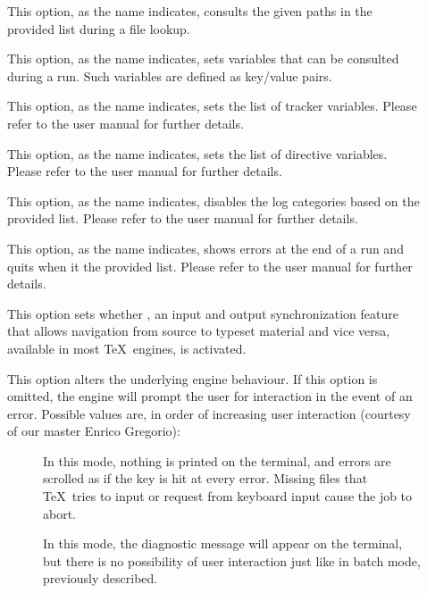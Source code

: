 \begin{description}
\begin{description}
\item[] This option, as the name indicates, consults the given paths in the provided list during a file lookup.

\item[] This option, as the name indicates, sets variables that can be consulted during a run. Such variables are defined as key/value pairs.

\item[]  This option, as the name indicates, sets the list of tracker variables. Please refer to the user manual for further details.

\item[]  This option, as the name indicates, sets the list of directive variables. Please refer to the user manual for further details.

\item[] This option, as the name indicates, disables the log categories based on the provided list. Please refer to the user manual for further details.

\item[]  This option, as the name indicates, shows errors at the end of a run and quits when it the provided list. Please refer to the user manual for further details.

\item[] This option sets whether , an input and output synchronization feature that allows navigation from source to typeset material and vice versa, available in most \TeX\ engines, is activated.

\item[] This option alters the underlying engine behaviour. If this option is omitted, the engine will prompt the user for interaction in the event of an error. Possible values are, in order of increasing user interaction (courtesy of our master Enrico Gregorio):

\begin{description}
\item[] In this mode, nothing is printed on the terminal, and errors are scrolled as if the  key is hit at every error. Missing files that \TeX\ tries to input or request from keyboard input cause the job to abort.

\item[] In this mode, the diagnostic message will appear on the terminal, but there is no possibility of user interaction just like in batch mode, previously described.
\end{description}


\end{description}
\end{description}
